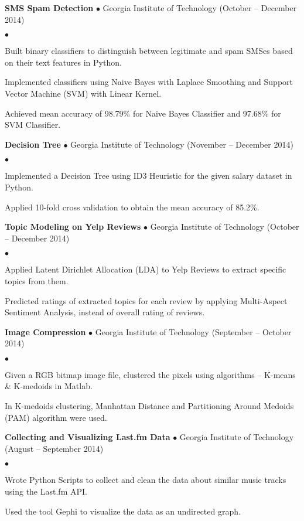 \documentclass[10pt]{article}
\newcommand{\project}[3]{{ \textbf{#1} $\bullet$ #2 \hfill (#3)\\  }}
\newenvironment{achievements}{\begin{list}{$\bullet$}{\topsep 0pt \itemsep 0pt}}{\end{list}}
\begin{document}
\project{SMS Spam Detection}{Georgia Institute of Technology}{October -- December 2014}
	\begin{achievements}
	\item Built binary classifiers to distinguish between legitimate and spam SMSes based on their text features in Python.
	\item Implemented classifiers using Naive Bayes with Laplace Smoothing and Support Vector Machine (SVM) with Linear Kernel.
	\item Achieved mean accuracy of 98.79\% for Naive Bayes Classifier and 97.68\% for SVM Classifier.
	\end{achievements}	
	
\project{Decision Tree}{Georgia Institute of Technology}{November -- December 2014}
	\begin{achievements}
	\item Implemented a Decision Tree using ID3 Heuristic for the given salary dataset in Python.
	\item Applied 10-fold cross validation to obtain the mean accuracy of 85.2\%.
	\end{achievements}	
	
\project{Topic Modeling on Yelp Reviews}{Georgia Institute of Technology}{October -- December 2014}
	\begin{achievements}
	\item Applied Latent Dirichlet Allocation (LDA) to Yelp Reviews to extract specific topics from them.
	\item Predicted ratings of extracted topics for each review by applying Multi-Aspect Sentiment Analysis, instead of overall rating of reviews.
	\end{achievements}	

\project{Image Compression}{Georgia Institute of Technology}{September -- October 2014}
	\begin{achievements}
	\item Given a RGB bitmap image file, clustered the pixels using algorithms -- K-means \& K-medoids in Matlab.
	\item In K-medoids clustering, Manhattan Distance and Partitioning Around Medoids (PAM) algorithm were used.
	\end{achievements}	

\project{Collecting and Visualizing Last.fm Data}{Georgia Institute of Technology}{August -- September 2014}
	\begin{achievements}
	\item Wrote Python Scripts to collect and clean the data about similar music tracks using the Last.fm API.
	\item Used the tool Gephi to visualize the data as an undirected graph.
	\end{achievements}	
	
\end{document}

